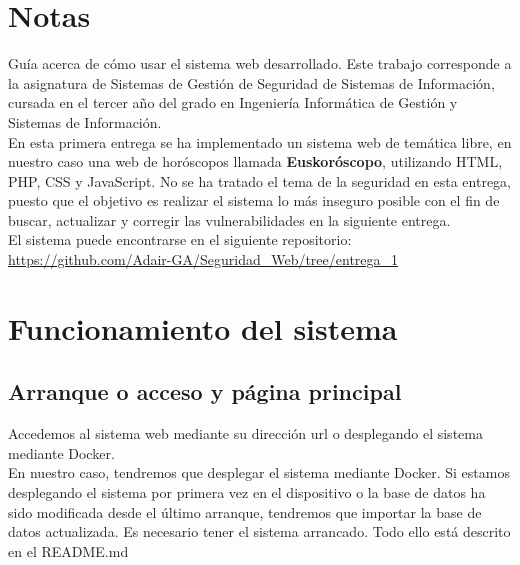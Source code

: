 \documentclass[12pt, twoside]{report}
\begin{document}
    

\thispagestyle{empty} %

\clearpage\setcounter{page}{-1} %

\chapter*{Notas}
%
\noindent Guía acerca de cómo usar el sistema web desarrollado. Este trabajo corresponde a la asignatura de Sistemas de Gestión de Seguridad de Sistemas de Información, cursada en el tercer año del grado en Ingeniería Informática de Gestión y Sistemas de Información.\\
\newline
En esta primera entrega se ha implementado un sistema web de temática libre, en nuestro caso una web de horóscopos llamada \textbf{Euskoróscopo}, utilizando HTML, PHP, CSS y JavaScript. No se ha tratado el tema de la seguridad en esta entrega, puesto que el objetivo es realizar el sistema lo más inseguro posible con el fin de buscar, actualizar y corregir las vulnerabilidades en la siguiente entrega.\\
\newline
El sistema puede encontrarse en el siguiente repositorio:\\
\href{https://github.com/Adair-GA/Seguridad_Web/tree/entrega_1}{https://github.com/Adair-GA/Seguridad\_Web/tree/entrega\_1}
\newline

\chapter{Funcionamiento del sistema}
\section{Arranque o acceso y página principal}
Accedemos al sistema web mediante su dirección url o desplegando el sistema mediante Docker.\\ En nuestro caso, tendremos que desplegar el sistema mediante Docker.
\newline
Si estamos desplegando el sistema por primera vez en el dispositivo o la base de datos ha sido modificada desde el último arranque, tendremos que importar la base de datos actualizada. Es necesario tener el sistema arrancado. Todo ello está descrito en el README.md\\
\end{document}
